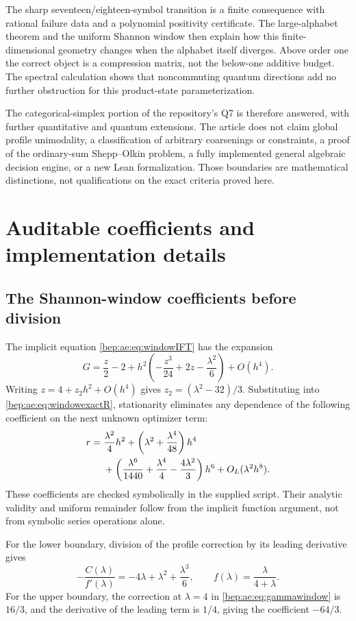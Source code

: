 \documentclass[11pt]{article}
\numberwithin{equation}{section}
\theoremstyle{definition}
\theoremstyle{remark}
\begin{document}
The sharp seventeen/eighteen-symbol transition is a finite consequence
with rational failure data and a polynomial positivity certificate.
The large-alphabet theorem and the uniform Shannon window then explain
how this finite-dimensional geometry changes when the alphabet itself
diverges. Above order one the correct object is a compression matrix,
not the below-one additive budget. The spectral calculation shows that
noncommuting quantum directions add no further obstruction for this
product-state parameterization.

The categorical-simplex portion of the repository's Q7 is therefore
answered, with further quantitative and quantum extensions. The article
does not claim global profile unimodality, a classification of arbitrary
coarsenings or constraints, a proof of the ordinary-sum Shepp--Olkin
problem, a fully implemented general algebraic decision engine, or a
new Lean formalization. Those boundaries are mathematical distinctions,
not qualifications on the exact criteria proved here.

\section{Auditable coefficients and implementation details}\label{bep:ae:app:coefficients}
\subsection{The Shannon-window coefficients before division}
The implicit equation \eqref{bep:ae:eq:windowIFT} has the expansion
\[
 G=\frac z2-2+h^2\left(-\frac{z^3}{24}+2z-\frac{\lambda^2}{6}\right)
 +O(h^4).
\]
Writing $z=4+z_2h^2+O(h^4)$ gives
$z_2=(\lambda^2-32)/3$. Substituting into
\eqref{bep:ae:eq:windowexactR}, stationarity eliminates any dependence of the
following coefficient on the next unknown optimizer term:
\begin{align}
 r={}&\frac{\lambda^2}{4}h^2
 +\left(\lambda^2+\frac{\lambda^4}{48}\right)h^4\notag\\
 &+\left(\frac{\lambda^6}{1440}+\frac{\lambda^4}{4}
                              -\frac{4\lambda^2}{3}\right)h^6
 +O_L(\lambda^2h^8).\label{bep:ae:eq:Rthird}
\end{align}
These coefficients are checked symbolically in the supplied script.
Their analytic validity and uniform remainder follow from the implicit
function argument, not from symbolic series operations alone.

For the lower boundary, division of the profile correction by its
leading derivative gives
\[
 -\frac{C(\lambda)}{f'(\lambda)}
 =-4\lambda+\lambda^2+\frac{\lambda^3}{6},
 \qquad f(\lambda)=\frac\lambda{4+\lambda}.
\]
For the upper boundary, the correction at $\lambda=4$ in
\eqref{bep:ae:eq:gammawindow} is $16/3$, and the derivative of the leading
term is $1/4$, giving the coefficient $-64/3$.
\end{document}
